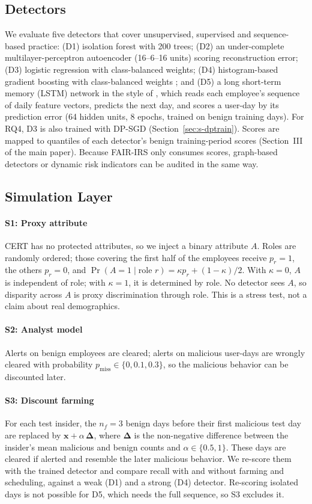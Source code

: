\documentclass[10pt,onecolumn,letterpaper]{article}
\newcommand{\Prob}{\Pr}
\begin{document}
\subsection{Detectors}
We evaluate five detectors that cover unsupervised, supervised and sequence-based practice: (D1) isolation forest  with 200 trees; (D2) an under-complete multilayer-perceptron autoencoder (16--6--16 units) scoring reconstruction error; (D3) logistic regression with class-balanced weights; (D4) histogram-based gradient boosting with class-balanced weights ; and (D5) a long short-term memory (LSTM) network in the style of , which reads each employee's sequence of daily feature vectors, predicts the next day, and scores a user-day by its prediction error (64 hidden units, 8 epochs, trained on benign training days). For RQ4, D3 is also trained with DP-SGD  (Section~\ref{sec:s-dptrain}). Scores are mapped to quantiles of each detector's benign training-period scores (Section~III of the main paper). Because FAIR-IRS only consumes scores, graph-based detectors  or dynamic risk indicators  can be audited in the same way.

\subsection{Simulation Layer}
\label{sec:s-sim}
\paragraph{S1: Proxy attribute} CERT has no protected attributes, so we inject a binary attribute $A$. Roles are randomly ordered; those covering the first half of the employees receive $p_r=1$, the others $p_r=0$, and $\Prob(A=1\mid\text{role }r)=\kappa p_r+(1-\kappa)/2$. With $\kappa=0$, $A$ is independent of role; with $\kappa=1$, it is determined by role. No detector sees $A$, so disparity across $A$ is proxy discrimination through role. This is a stress test, not a claim about real demographics.

\paragraph{S2: Analyst model} Alerts on benign employees are cleared; alerts on malicious user-days are wrongly cleared with probability $p_{\mathrm{miss}}\in\{0,0.1,0.3\}$, so the malicious behavior can be discounted later.

\paragraph{S3: Discount farming} For each test insider, the $n_f=3$ benign days before their first malicious test day are replaced by $\mathbf{x}+\alpha\,\boldsymbol{\Delta}$, where $\boldsymbol{\Delta}$ is the non-negative difference between the insider's mean malicious and benign counts and $\alpha\in\{0.5,1\}$. These days are cleared if alerted and resemble the later malicious behavior. We re-score them with the trained detector and compare recall with and without farming and scheduling, against a weak (D1) and a strong (D4) detector. Re-scoring isolated days is not possible for D5, which needs the full sequence, so S3 excludes it.
\end{document}
